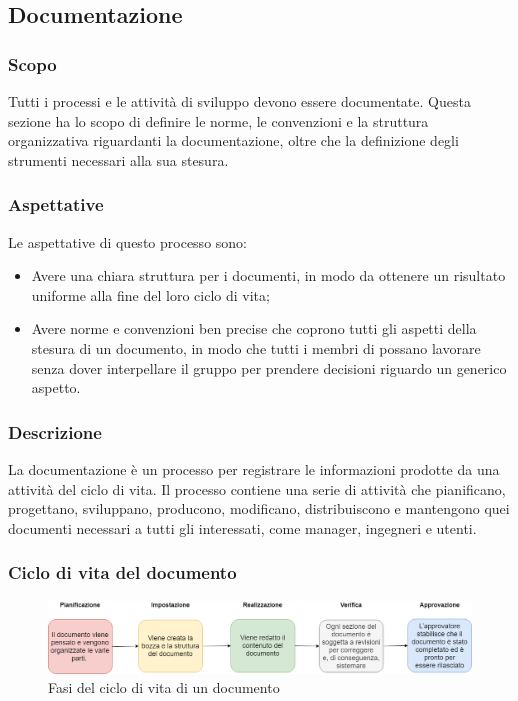 \subsection{Documentazione}
\subsubsection{Scopo}
Tutti i processi e le attività di sviluppo devono essere documentate. Questa sezione ha lo scopo di definire le norme, le convenzioni e la struttura organizzativa riguardanti la documentazione, oltre che la definizione degli strumenti necessari alla sua stesura.
\subsubsection{Aspettative}
Le aspettative di questo processo sono:
\begin{itemize}
	\item Avere una chiara struttura per i documenti, in modo da ottenere un risultato uniforme alla fine del loro ciclo di vita;	
	\item Avere norme e convenzioni ben precise che coprono tutti gli aspetti della stesura di un documento, in modo che tutti i membri di \Gruppo{} possano lavorare senza dover interpellare il gruppo per prendere decisioni riguardo un generico aspetto.
\end{itemize}
\subsubsection{Descrizione}
La documentazione è un processo per registrare le informazioni prodotte da una attività del ciclo di vita. Il processo contiene una serie di attività che pianificano, progettano, sviluppano, producono, modificano, distribuiscono e mantengono quei documenti necessari a tutti gli interessati, come manager, ingegneri e utenti.
\subsubsection{Ciclo di vita del documento}
\begin{figure}[!htb]
     \centering
     \includegraphics[scale=0.45]{Images/DocumentLifeCycle.png}
     \caption{Fasi del ciclo di vita di un documento}
\end{figure}


